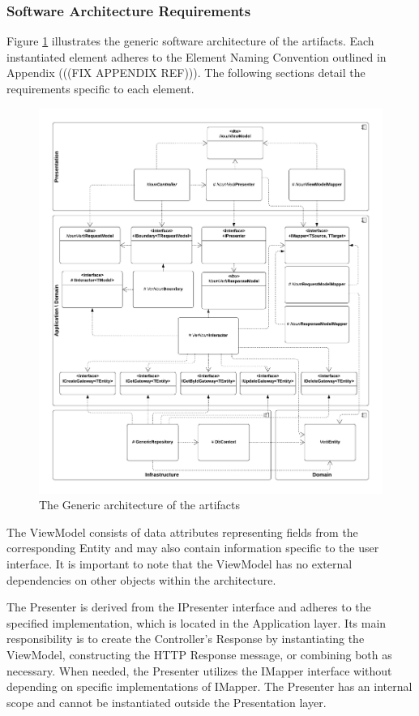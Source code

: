 \subsubsection{Software Architecture Requirements} \label{software_requirements}

Figure \ref{fig_design} illustrates the generic software architecture of the artifacts.
Each instantiated element adheres to the Element Naming Convention outlined in Appendix
(((FIX APPENDIX REF))). The following sections detail the requirements
specific to each element.

\begin{figure}[ht!]
    \centering
    \includegraphics[width=\textwidth]{figures/generic_design.pdf}
    \caption[Generic architecture]{The Generic architecture of the artifacts}
    \label{fig_design}
\end{figure}

The ViewModel consists of data attributes representing fields from the corresponding
Entity and may also contain information specific to the user interface. It is important to
note that the ViewModel has no external dependencies on other objects within the
architecture.

The Presenter is derived from the IPresenter interface and adheres to the specified
implementation, which is located in the Application layer. Its main responsibility is to
create the Controller's Response by instantiating the ViewModel, constructing the HTTP
Response message, or combining both as necessary. When needed, the Presenter utilizes the
IMapper interface without depending on specific implementations of IMapper. The Presenter
has an internal scope and cannot be instantiated outside the Presentation layer.

